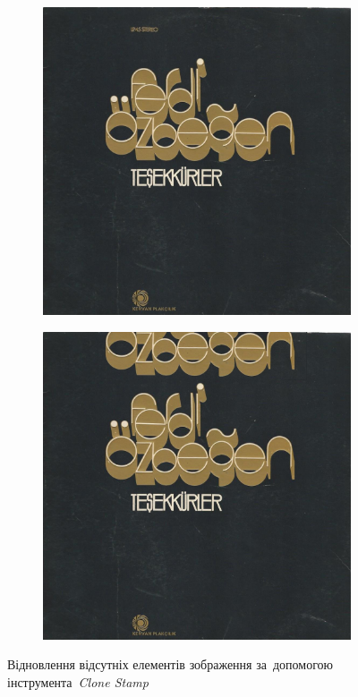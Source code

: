 \documentclass[
	a4paper,
	oneside,
	BCOR = 10mm,
	DIV = 12,
	12pt,
	headings = normal,
]{scrartcl}
\begin{document}
				\begin{figure}[!htbp]
					\centering
					\begin{subfigure}{0.5\textwidth}
						\centering
						\includegraphics[height = 6\baselineskip]{./../01-solution/src.jpeg}
						\caption{}
						\label{subfig:03-01-src}
					\end{subfigure}%
					\begin{subfigure}{0.5\textwidth}
						\centering
						\includegraphics[height = 6\baselineskip]{./../01-solution/y03s01-multimedia-lab-02-01-p03-clone-stamp.jpg}
						\caption{}
						\label{subfig:03-02-res}
					\end{subfigure}
					\caption{Відновлення відсутніх елементів зображення за~допомогою інструмента~\emph{\textenglish{Clone Stamp}}}
					\label{fig:03-addition-clone-stamp}
				\end{figure}
\end{document}
